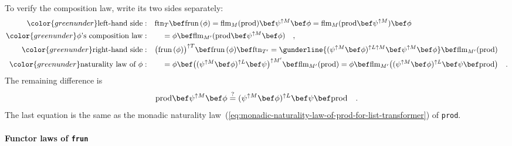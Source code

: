 To verify the composition law, write its two sides separately:
\begin{align*}
{\color{greenunder}\text{left-hand side}:}\quad & \text{ftn}_{T}\bef\text{frun}\,(\phi)=\text{flm}_{M}(\text{prod})\bef\psi^{\uparrow M}\bef\phi=\text{flm}_{M}(\text{prod}\bef\psi^{\uparrow M})\bef\phi\\
{\color{greenunder}\phi\text{\textsf{'}s composition law}:}\quad & \quad=\phi\bef\text{flm}_{M^{\prime}}(\text{prod}\bef\psi^{\uparrow M}\bef\phi)\quad,\\
{\color{greenunder}\text{right-hand side}:}\quad & \big(\text{frun}\,(\phi)\big)^{\uparrow T}\bef\text{frun}\,(\phi)\bef\text{ftn}_{T^{\prime}}=\gunderline{(\psi^{\uparrow M}\bef\phi)^{\uparrow L\uparrow M}\bef\psi^{\uparrow M}\bef\phi}\bef\text{flm}_{M^{\prime}}(\text{prod})\\
{\color{greenunder}\text{naturality law of }\phi:}\quad & \quad=\phi\bef\big((\psi^{\uparrow M}\bef\phi)^{\uparrow L}\bef\psi\big)^{\uparrow M^{\prime}}\bef\text{flm}_{M^{\prime}}(\text{prod})=\phi\bef\text{flm}_{M^{\prime}}\big((\psi^{\uparrow M}\bef\phi)^{\uparrow L}\bef\psi\bef\text{prod}\big)\quad.
\end{align*}
The remaining difference is
\[
\text{prod}\bef\psi^{\uparrow M}\bef\phi\overset{?}{=}(\psi^{\uparrow M}\bef\phi)^{\uparrow L}\bef\psi\bef\text{prod}\quad.
\]
The last equation is the same as the monadic naturality law~(\ref{eq:monadic-naturality-law-of-prod-for-list-transformer})
of \lstinline!prod!.

\paragraph{Functor laws of \texttt{frun}}

